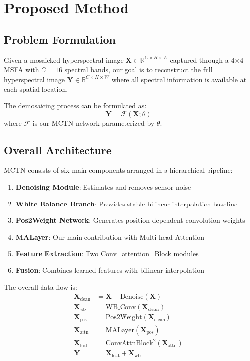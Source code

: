 \documentclass[conference]{IEEEtran}
\begin{document}
\section{Proposed Method}

\subsection{Problem Formulation}

Given a mosaicked hyperspectral image $\mathbf{X} \in \mathbb{R}^{C \times H \times W}$ captured through a 4×4 MSFA with $C=16$ spectral bands, our goal is to reconstruct the full hyperspectral image $\mathbf{Y} \in \mathbb{R}^{C \times H \times W}$ where all spectral information is available at each spatial location.

The demosaicing process can be formulated as:
\begin{equation}
\mathbf{Y} = \mathcal{F}(\mathbf{X}; \theta)
\end{equation}
where $\mathcal{F}$ is our MCTN network parameterized by $\theta$.

\subsection{Overall Architecture}

MCTN consists of six main components arranged in a hierarchical pipeline:

\begin{enumerate}
    \item \textbf{Denoising Module}: Estimates and removes sensor noise
    \item \textbf{White Balance Branch}: Provides stable bilinear interpolation baseline
    \item \textbf{Pos2Weight Network}: Generates position-dependent convolution weights
    \item \textbf{MALayer}: Our main contribution with Multi-head Attention
    \item \textbf{Feature Extraction}: Two Conv\_attention\_Block modules
    \item \textbf{Fusion}: Combines learned features with bilinear interpolation
\end{enumerate}

The overall data flow is:
\begin{equation}
\begin{aligned}
\mathbf{X}_{\text{clean}} &= \mathbf{X} - \text{Denoise}(\mathbf{X}) \\
\mathbf{X}_{\text{wb}} &= \text{WB\_Conv}(\mathbf{X}_{\text{clean}}) \\
\mathbf{X}_{\text{pos}} &= \text{Pos2Weight}(\mathbf{X}_{\text{clean}}) \\
\mathbf{X}_{\text{attn}} &= \text{MALayer}(\mathbf{X}_{\text{pos}}) \\
\mathbf{X}_{\text{feat}} &= \text{ConvAttnBlock}^2(\mathbf{X}_{\text{attn}}) \\
\mathbf{Y} &= \mathbf{X}_{\text{feat}} + \mathbf{X}_{\text{wb}}
\end{aligned}
\end{equation}
\end{document}
